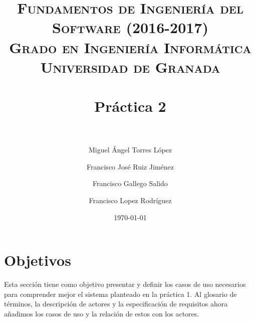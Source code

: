 



\title{	
\normalfont \normalsize 
\textsc{\textbf{Fundamentos de Ingeniería del Software (2016-2017)} \\ Grado en Ingeniería Informática \\ Universidad de Granada} \\ [25pt] %
\horrule{2pt} \\[0.4cm] %
\huge Práctica 2 \\ %
\horrule{2pt} \\[0.5cm] %
}

\author{Miguel Ángel Torres López \and Francisco José Ruiz Jiménez \and Francisco Gallego Salido \and Francisco Lopez Rodríguez} %


\date{\normalsize\today} %




\maketitle %

\newpage %

\tableofcontents %

\listoffigures

\newpage


\section{Objetivos}

Esta sección tiene como objetivo presentar y definir los casos de uso necesarios para comprender mejor el sistema planteado en la práctica 1. Al glosario de términos, 
la descripción de actores y la especificación de requisitos ahora añadimos los casos de uso y la relación de estos con los actores.

